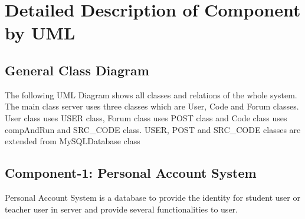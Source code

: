 \chapter{Detailed Description of Component by UML}
\section{General Class Diagram}
The following UML Diagram shows all classes and relations of the whole system.\newline
The main class server uses three classes which are User, Code and Forum classes. User class uses USER class, Forum class uses POST class and Code class uses compAndRun and SRC\_CODE class. USER, POST and SRC\_CODE classes are extended from MySQLDatabase class\newline
\begin{figure}[H]
 \label{1}
 \end{figure}
\clearpage

\section{Component-1: Personal Account System}
Personal Account System is a database to provide the identity for student user or teacher user in server and provide several functionalities to user.

